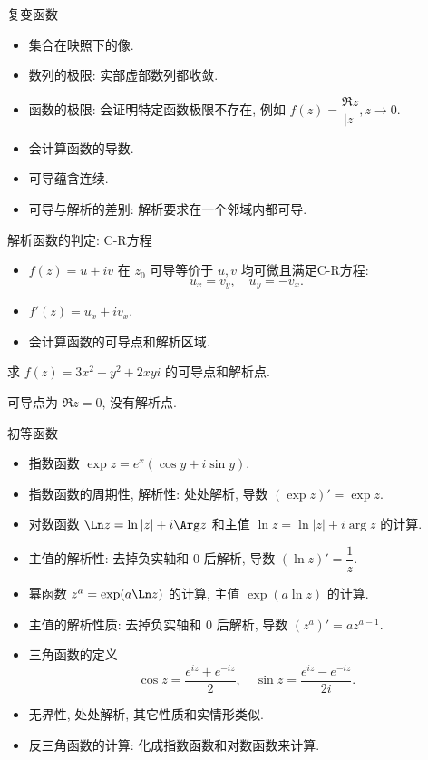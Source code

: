 \documentclass[aspectratio=169,handout]{ctexbeamer}
\begin{document}
\begin{frame}{复变函数}
\begin{itemize}
\item 集合在映照下的像.
\item 数列的极限: 实部虚部数列都收敛.
\item 函数的极限: 会证明特定函数极限不存在, 例如 $f(z)=\dfrac{\Re z}{|z|}, z\to 0$.
\item 会计算函数的导数.
\item 可导蕴含连续.
\item 可导与解析的差别: 解析要求在一个邻域内都可导.
\end{itemize}
\end{frame}


\begin{frame}{解析函数的判定: C-R方程}
\begin{itemize}
\item $f(z)=u+iv$ 在 $z_0$ 可导等价于 $u,v$ 均可微且满足C-R方程:
\[u_x=v_y,\quad u_y=-v_x.\]
\item $f'(z)=u_x+iv_x$.
\item 会计算函数的可导点和解析区域.
\end{itemize}
\onslide<+->
\begin{exercise}
求 $f(z)=3x^2-y^2+2xyi$ 的可导点和解析点.
\end{exercise}
\onslide<+->
\begin{answer}
可导点为 $\Re z=0$, 没有解析点.
\end{answer}
\end{frame}


\begin{frame}{初等函数}
\begin{itemize}
\item 指数函数 $\exp z=e^x(\cos y+i\sin y)$.
\item 指数函数的周期性, 解析性: 处处解析, 导数 $(\exp z)'=\exp z$.
\item 对数函数 $\Ln z=\ln|z|+i\Arg z$ 和主值 $\ln z=\ln|z|+i\arg z$ 的计算.
\item 主值的解析性: 去掉负实轴和 $0$ 后解析, 导数 $(\ln z)'=\dfrac1z$.
\item 幂函数 $z^a=\exp(a\Ln z)$ 的计算, 主值 $\exp(a\ln z)$ 的计算.
\item 主值的解析性质: 去掉负实轴和 $0$ 后解析, 导数 $(z^a)'=az^{a-1}$.
\item 三角函数的定义
\[\cos z=\frac{e^{iz}+e^{-iz}}2,\quad
\sin z=\frac{e^{iz}-e^{-iz}}{2i}.\]
\item 无界性, 处处解析, 其它性质和实情形类似.
\item 反三角函数的计算: 化成指数函数和对数函数来计算.
\end{itemize}
\end{frame}
\end{document}
